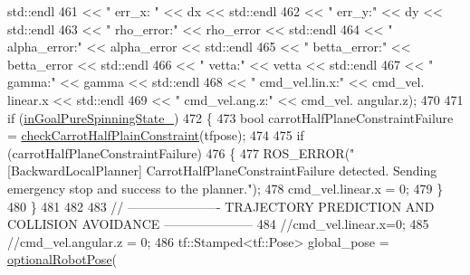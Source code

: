 \begin{DoxyCode}
{      std::endl
461                                                                          << \textcolor{stringliteral}{" err\_x: "} << dx << std::endl
462                                                                          << \textcolor{stringliteral}{" err\_y:"} << dy << std::endl
463                                                                          << \textcolor{stringliteral}{" rho\_error:"} << rho\_error << 
      std::endl
464                                                                          << \textcolor{stringliteral}{" alpha\_error:"} << alpha\_error 
      << std::endl
465                                                                          << \textcolor{stringliteral}{" betta\_error:"} << betta\_error 
      << std::endl
466                                                                          << \textcolor{stringliteral}{" vetta:"} << vetta << std::endl
467                                                                          << \textcolor{stringliteral}{" gamma:"} << gamma << std::endl
468                                                                          << \textcolor{stringliteral}{" cmd\_vel.lin.x:"} << cmd\_vel.
      linear.x << std::endl
469                                                                          << \textcolor{stringliteral}{" cmd\_vel.ang.z:"} << cmd\_vel.
      angular.z);
470 
471                 \textcolor{keywordflow}{if} (\hyperlink{classcl__move__base__z_1_1backward__local__planner_1_1BackwardLocalPlanner_ae4d7254afd19ae1f7bd8eac9f5d58b9a}{inGoalPureSpinningState\_})
472                 \{
473                     \textcolor{keywordtype}{bool} carrotHalfPlaneConstraintFailure = 
      \hyperlink{classcl__move__base__z_1_1backward__local__planner_1_1BackwardLocalPlanner_a22938e354a4ec489101295ed7f2539f6}{checkCarrotHalfPlainConstraint}(tfpose);
474 
475                     \textcolor{keywordflow}{if} (carrotHalfPlaneConstraintFailure)
476                     \{
477                         ROS\_ERROR(\textcolor{stringliteral}{"[BackwardLocalPlanner] CarrotHalfPlaneConstraintFailure detected.
       Sending emergency stop and success to the planner."});
478                         cmd\_vel.linear.x = 0;
479                     \}
480                 \}
481         
482 
483             \textcolor{comment}{// ---------------------- TRAJECTORY PREDICTION AND COLLISION AVOIDANCE ---------------------}
484             \textcolor{comment}{//cmd\_vel.linear.x=0;}
485             \textcolor{comment}{//cmd\_vel.angular.z = 0;}
486             tf::Stamped<tf::Pose> global\_pose = \hyperlink{namespacecl__move__base__z_1_1backward__local__planner_afd5bb2a0d144f7b89f4215fbcb1fbe69}{optionalRobotPose}(
}
\end{DoxyCode}
